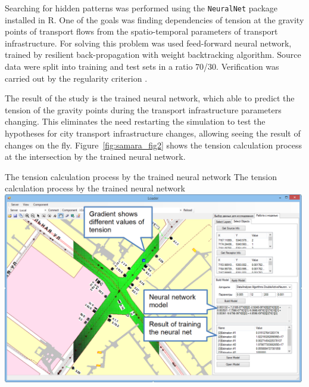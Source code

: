 Searching for hidden patterns was performed using the \lstinline|NeuralNet| package installed in R. One of the goals was finding dependencies of tension at the gravity points of transport flows from the spatio-temporal parameters of transport infrastructure. For solving this problem was used feed-forward neural network, trained by resilient back-propagation with weight backtracking algorithm. Source data were split into training and test sets in a ratio 70/30. Verification was carried out by the regularity criterion \citep[][]{MikheevaEtAl_2012}.

The result of the study is the trained neural network, which able to predict the tension of the gravity points during the transport infrastructure parameters changing. This eliminates the need restarting the simulation to test the hypotheses for city transport infrastructure changes, allowing seeing the result of changes on the fly. Figure~\ref{fig:samara_fig2} shows the tension calculation process at the intersection by the trained neural network.

\createfigure%
{The tension calculation process by the trained neural network}%
{The tension calculation process by the trained neural network}%
{\label{fig:samara_fig2}}%
{\includegraphics[width=0.99\textwidth, angle=0]{./scenarios/figures/samara_fig2.png}}%
{}

